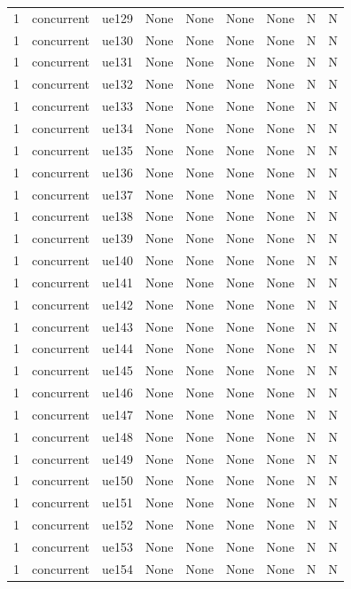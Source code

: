 \begin{table}[ht]
\begin{tabular}{|c|c|c|c|c|c|c|c|c|}
1 & concurrent & ue129 & None & None & None & None & N & N \\
1 & concurrent & ue130 & None & None & None & None & N & N \\
1 & concurrent & ue131 & None & None & None & None & N & N \\
1 & concurrent & ue132 & None & None & None & None & N & N \\
1 & concurrent & ue133 & None & None & None & None & N & N \\
1 & concurrent & ue134 & None & None & None & None & N & N \\
1 & concurrent & ue135 & None & None & None & None & N & N \\
1 & concurrent & ue136 & None & None & None & None & N & N \\
1 & concurrent & ue137 & None & None & None & None & N & N \\
1 & concurrent & ue138 & None & None & None & None & N & N \\
1 & concurrent & ue139 & None & None & None & None & N & N \\
1 & concurrent & ue140 & None & None & None & None & N & N \\
1 & concurrent & ue141 & None & None & None & None & N & N \\
1 & concurrent & ue142 & None & None & None & None & N & N \\
1 & concurrent & ue143 & None & None & None & None & N & N \\
1 & concurrent & ue144 & None & None & None & None & N & N \\
1 & concurrent & ue145 & None & None & None & None & N & N \\
1 & concurrent & ue146 & None & None & None & None & N & N \\
1 & concurrent & ue147 & None & None & None & None & N & N \\
1 & concurrent & ue148 & None & None & None & None & N & N \\
1 & concurrent & ue149 & None & None & None & None & N & N \\
1 & concurrent & ue150 & None & None & None & None & N & N \\
1 & concurrent & ue151 & None & None & None & None & N & N \\
1 & concurrent & ue152 & None & None & None & None & N & N \\
1 & concurrent & ue153 & None & None & None & None & N & N \\
1 & concurrent & ue154 & None & None & None & None & N & N \\

\end{tabular}
\end{table}
